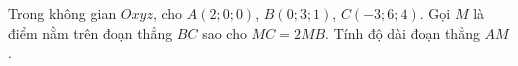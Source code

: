 \begin{ex}
Trong không gian $Oxyz$, cho $A(2;0;0)$, $B(0;3;1)$, $C(-3;6;4)$. Gọi $M$ là điểm nằm trên đoạn thẳng $BC$ sao cho $MC=2MB$. Tính độ dài đoạn thẳng $AM$.
\end{ex}
